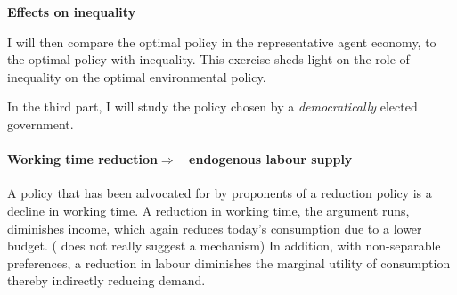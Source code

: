 \documentclass[12pt]{article}
\newcommand{\ar}{$\Rightarrow$ \ }
\begin{document}

\textbf{Effects on inequality}

I will then compare the optimal policy in the representative agent economy, to the optimal policy with inequality. This exercise sheds light on the role of inequality on the optimal environmental policy. 

In the third part, I will study the policy chosen by a \textit{democratically} elected government. 




 
\paragraph{Working time reduction\ar endogenous labour supply}
A policy that has been advocated for by  proponents of a reduction policy is a decline in working time. A reduction in working time, the argument runs, diminishes income, which again reduces today's consumption due to a lower budget.
(\cite{Schor2005SustainableReduction} does not really suggest a mechanism)
In addition, with non-separable preferences, a reduction in labour diminishes the marginal utility of consumption thereby indirectly reducing demand. 
\end{document}
